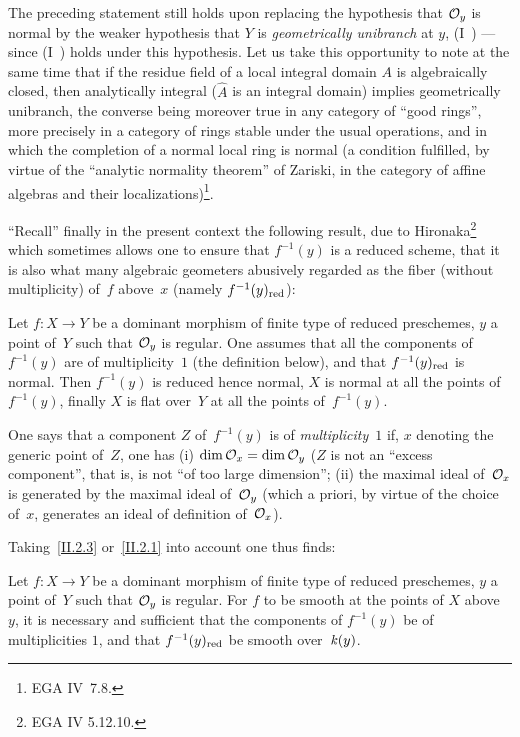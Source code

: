 \begin{remarks}
\label{II.2.4}
The preceding statement still holds upon replacing
the hypothesis that $\cal{O}_{y}$ is normal by the weaker
hypothesis that $Y$ is \emph{geometrically unibranch} at $y$,
(\cf I~) --- since (I~) holds under this
hypothesis. Let us take this opportunity to note at the same time
that if the residue field of a local integral domain $A$ is
algebraically closed, then analytically integral
(\ie $\widehat{A}$ is an integral domain) implies geometrically
unibranch, the converse being moreover true in any
category of ``good rings'', more precisely in a
category of rings stable under the usual operations, and
in which the completion of a normal local ring is normal
(a condition fulfilled, by virtue of the ``analytic normality
theorem'' of Zariski, in the category of affine
algebras and their localizations)\footnote{\Cf EGA IV~7.8.}.

``Recall'' finally in the present context the following result,
due to Hironaka\footnote{\Cf EGA IV 5.12.10.} which sometimes allows
one to ensure that $f^{-1}(y)$ is a reduced scheme, \ie that
it is also what many algebraic geometers
abusively regarded as the fiber (without multiplicity)
of~$f$ above~$x$ (namely $f^{-1}(y)_{\red}$):
\end{remarks}

\begin{proposition}
\label{II.2.5}
Let $f\colon X\to Y$ be a dominant morphism of finite type of
reduced preschemes, $y$ a point of~$Y$ such that
$\cal{O}_{y}$ is regular. One assumes that all the components
of~$f^{-1}(y)$ are of multiplicity~$1$
(\cf the definition below), and that $f^{-1}(y)_{\red}$ is
normal. Then $f^{-1}(y)$ is reduced hence normal, $X$ is normal
at all the points of~$f^{-1}(y)$, finally $X$ is flat over~$Y$ at all
the points of~$f^{-1}(y)$.
\end{proposition}
One
says that a component $Z$ of~$f^{-1}(y)$ is of
\emph{multiplicity}~$1$
if, $x$ denoting the generic point of~$Z$, one has (i)
$\dim\cal{O}_{x}=\dim\cal{O}_{y}$ (\ie $Z$ is not an ``excess
component'', that is, is not ``of too large
dimension''; (ii) the maximal ideal of~$\cal{O}_{x}$ is generated
by the maximal ideal of~$\cal{O}_{y}$ (which a priori, by virtue of
the choice of~$x$, generates an ideal of definition
of~$\cal{O}_{x}$).

Taking~\ref{II.2.3} or~\ref{II.2.1} into account one thus finds:

\begin{corollary}
\label{II.2.6}
Let $f\colon X\to Y$ be a dominant morphism of finite type of
reduced preschemes, $y$ a point of~$Y$ such that
$\cal{O}_{y}$ is regular. For $f$ to be smooth at the points of
$X$ above~$y$, it is necessary and sufficient that the components of
$f^{-1}(y)$ be of multiplicities $1$, and that $f^{-1}(y)_{\red}$
be smooth over~$\kres(y)$.
\end{corollary}

